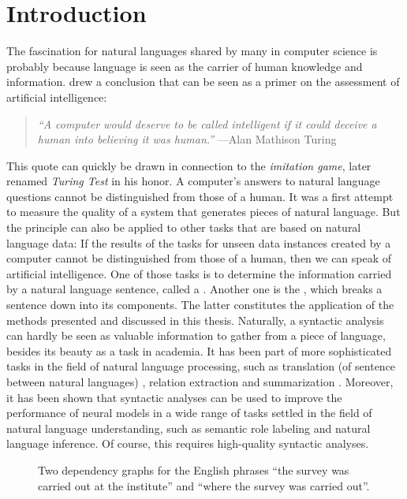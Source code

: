 \documentclass[../document.tex]{subfiles}
\begin{document}
    \chapter{Introduction}
    The fascination for natural languages shared by many in computer science is probably because language is seen as the carrier of human knowledge and information.
    \citet{Turing50} drew a conclusion that can be seen as a primer on the assessment of artificial intelligence:
    \begin{quote}
        \emph{``A computer would deserve to be called intelligent if it could deceive a human into believing it was human.''} \hfill ---Alan Mathison Turing
    \end{quote}
    This quote can quickly be drawn in connection to the \emph{imitation game}, later renamed \emph{Turing Test} in his honor.
    A computer's answers to natural language questions cannot be distinguished from those of a human.
    It was a first attempt to measure the quality of a system that generates pieces of natural language.
    But the principle can also be applied to other tasks that are based on natural language data:
        If the results of the tasks for unseen data instances created by a computer cannot be distinguished from those of a human, then we can speak of artificial intelligence.
    One of those tasks is to determine the information carried by a natural language sentence, called a .
    Another one is the , which breaks a sentence down into its components.
    The latter constitutes the application of the methods presented and discussed in this thesis.
    Naturally, a syntactic analysis can hardly be seen as valuable information to gather from a piece of language, besides its beauty as a task in academia.
    It has been part of more sophisticated tasks in the field of natural language processing, such as translation (of sentence between natural languages) \citep{Zhang19,Yang22}, relation extraction \citep{Ngu19} and summarization \citep{Bal21}.
    Moreover, it has been shown that syntactic analyses can be used to improve the performance of neural models in a wide range of tasks settled in the field of natural language understanding, such as semantic role labeling and natural language inference. \citep{Liu19, Wang19, Fei20}
    Of course, this requires high-quality syntactic analyses.
    
    \begin{figure}
        \null\hfill
        
        \hfill
        
        \hfill\null
        \caption{\label{fig:dependency}
            Two dependency graphs for the English phrases ``the survey was carried out at the institute'' and ``where the survey was carried out''.
        }
    \end{figure}
    
\end{document}
